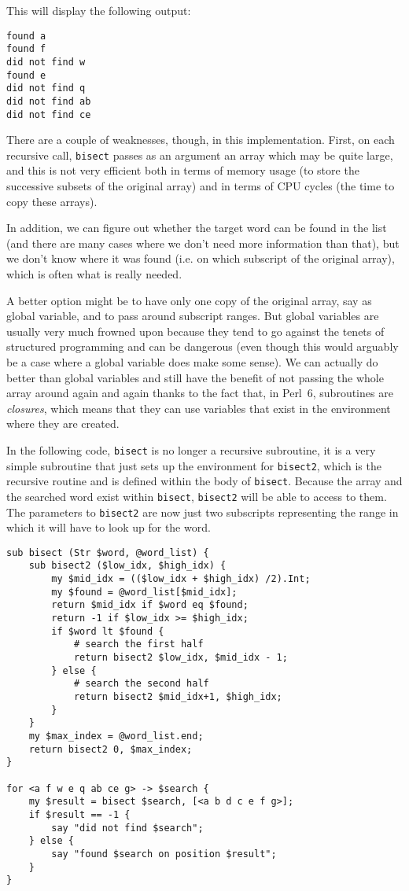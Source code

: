This will display the following output:
\begin{verbatim}
found a
found f
did not find w
found e
did not find q
did not find ab
did not find ce
\end{verbatim}

There are a couple of weaknesses, though, in this 
implementation. First, on each recursive call, 
{\tt bisect} passes as an argument an array 
which may be quite large, and this is not very 
efficient both in terms of memory usage (to store 
the successive subsets of the original array) and 
in terms of CPU cycles (the time to copy these 
arrays).

In addition, we can figure out whether the target word can 
be found in the list (and there are many cases where 
we don't need more information than that), but we don't 
know where it was found (i.e. on which subscript of 
the original array), which is often what is really 
needed.

A better option might be to have only one copy of the 
original array, say as global variable, and to pass 
around subscript ranges. But global variables are 
usually very much frowned upon because they tend to go 
against the tenets of structured programming and can 
be dangerous (even though this would arguably be a 
case where a global variable does make some sense). 
We can actually do better than global 
variables and still have the benefit of not passing 
the whole array around again and again thanks to the 
fact that, in Perl~6, subroutines are \emph{closures}, 
which means that they can use variables that exist in 
the environment where they are created.

In the following code, {\tt bisect} is no longer a 
recursive subroutine, it is a very simple subroutine 
that just sets up the environment for {\tt bisect2},
which is the recursive routine and is defined within 
the body of {\tt bisect}. Because the array and the 
searched word exist within {\tt bisect}, {\tt bisect2} 
will be able to access to them. The parameters to 
{\tt bisect2} are now just two subscripts representing 
the range in which it will have to look up for the 
word.

\begin{verbatim}
sub bisect (Str $word, @word_list) {
    sub bisect2 ($low_idx, $high_idx) {
        my $mid_idx = (($low_idx + $high_idx) /2).Int;
        my $found = @word_list[$mid_idx];
        return $mid_idx if $word eq $found;
        return -1 if $low_idx >= $high_idx;
        if $word lt $found {
            # search the first half
            return bisect2 $low_idx, $mid_idx - 1;
        } else {
            # search the second half
            return bisect2 $mid_idx+1, $high_idx;
        }
    }
    my $max_index = @word_list.end;
    return bisect2 0, $max_index;
}

for <a f w e q ab ce g> -> $search { 
    my $result = bisect $search, [<a b d c e f g>];
    if $result == -1 {
        say "did not find $search";
    } else {
        say "found $search on position $result";
    }
}
\end{verbatim}


